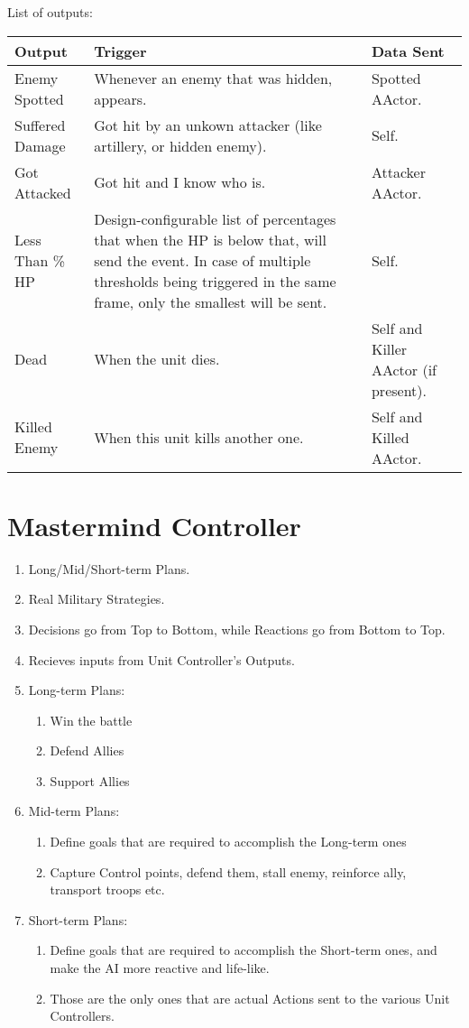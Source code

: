 \documentclass[12pt]{report}
\begin{document}
List of outputs:

\begin{tabularx}{\linewidth}{p{3cm} X p{3cm}}
\toprule
\textbf{Output} & \textbf{Trigger} & \textbf{Data Sent}\\ \midrule
Enemy Spotted   & Whenever an enemy that was hidden, appears. & Spotted AActor.\\ \midrule
Suffered Damage & Got hit by an unkown attacker (like artillery, or hidden enemy). & Self.\\ \midrule
Got Attacked    & Got hit and I know who is. & Attacker AActor.\\ \midrule
Less Than \% HP & Design-configurable list of percentages that when the
                  HP is below that, will send the event.
                  In case of multiple thresholds being triggered in the same frame,
                  only the smallest will be sent. & Self.\\ \midrule
Dead            & When the unit dies.             & Self and Killer AActor (if present).\\ \midrule
Killed Enemy    & When this unit kills another one. & Self and Killed AActor.\\
\bottomrule
\end{tabularx}

\section{Mastermind Controller}
\begin{enumerate}
\item Long/Mid/Short-term Plans.
\item Real Military Strategies.
\item Decisions go from Top to Bottom, while Reactions go from Bottom to Top.
\item Recieves inputs from Unit Controller's Outputs.
\item Long-term Plans:
	\begin{enumerate}
	\item Win the battle
	\item Defend Allies
	\item Support Allies
	\end{enumerate}
\item Mid-term Plans:
	\begin{enumerate}
	\item Define goals that are required to accomplish the Long-term ones
	\item Capture Control points, defend them, stall enemy, reinforce ally, transport troops etc.
	\end{enumerate}
\item Short-term Plans:
	\begin{enumerate}
	\item Define goals that are required to accomplish the Short-term ones, and make the AI more reactive and life-like.
	\item Those are the only ones that are actual Actions sent to the various Unit Controllers.
	\end{enumerate}
\end{enumerate}
\end{document}
